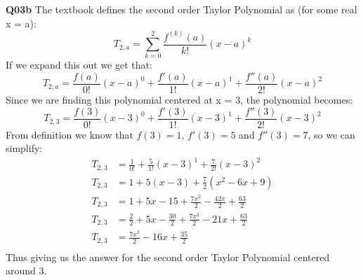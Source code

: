 \documentclass[11pt]{article}
\begin{document}
\textbf{Q03b} The textbook defines the second order Taylor Polynomial as (for some real x = a):
\[ T_{2,a}= \sum_{k=0}^{2}\frac{f^{(k)}(a)}{k!}(x-a)^k \]
If we expand this out we get that:
\[ T_{2,a}= \frac{f(a)}{0!}(x-a)^0 + \frac{f'(a)}{1!}(x-a)^1 + \frac{f''(a)}{2!}(x-a)^2  \]
Since we are finding this polynomial centered at x = 3, the polynomial becomes:
\[ T_{2,3}= \frac{f(3)}{0!}(x-3)^0 + \frac{f'(3)}{1!}(x-3)^1 + \frac{f''(3)}{2!}(x-3)^2  \]
From definition we know that $f(3) = 1$, $f'(3) = 5$ and $f''(3) = 7$, so we can simplify:
\begin{align*}
T_{2,3}& = \frac{1}{0!} + \frac{5}{1!}(x-3)^1 + \frac{7}{2!}(x-3)^2 \\
T_{2,3}& = 1 + 5(x-3) + \frac{7}{2}(x^2-6x+9) \\
T_{2,3}& = 1 + 5x - 15 + \frac{7x^2}{2} - \frac{42x}{2} +\frac{63}{2}  \\
T_{2,3}& = \frac{2}{2} + 5x - \frac{30}{2} + \frac{7x^2}{2} - 21x +\frac{63}{2}  \\
T_{2,3}& = \frac{7x^2}{2} - 16x +\frac{35}{2}  \\
\end{align*}
Thus giving us the answer for the second order Taylor Polynomial centered around 3. \\\\\\\\\\\\\\\\\\\\\\\\\\\\\\\\
\end{document}

